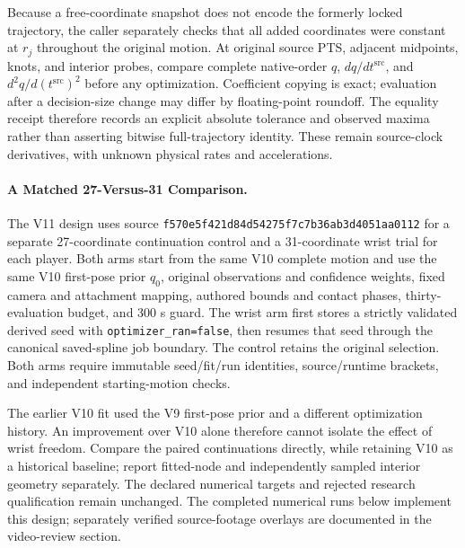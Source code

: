 \documentclass[11pt,letterpaper]{article}
\newcommand{\code}[1]{\nolinkurl{#1}}
\newcommand{\hash}[1]{{\footnotesize\nolinkurl{#1}}}
\begin{document}
Because a free-coordinate snapshot does not encode the formerly locked
trajectory, the caller separately checks that all added coordinates were
constant at $r_j$ throughout the original motion. At original source PTS,
adjacent midpoints, knots, and interior probes, compare complete native-order
$q$, $dq/dt^{\mathrm{src}}$, and $d^2q/d(t^{\mathrm{src}})^2$ before any
optimization. Coefficient copying is exact; evaluation after a decision-size
change may differ by floating-point roundoff. The equality receipt therefore
records an explicit absolute tolerance and observed maxima rather than
asserting bitwise full-trajectory identity. These remain source-clock
derivatives, with unknown physical rates and accelerations.

\paragraph{A Matched 27-Versus-31 Comparison.}
The V11 design uses source
\hash{f570e5f421d84d54275f7c7b36ab3d4051aa0112} for a separate
27-coordinate continuation control and a 31-coordinate wrist trial for each
player. Both arms start from the same V10 complete motion and use the same
V10 first-pose prior $q_0$, original observations and confidence weights,
fixed camera and attachment mapping, authored bounds and contact phases,
thirty-evaluation budget, and 300 s guard. The wrist arm first stores a
strictly validated derived seed with \code{optimizer_ran=false}, then resumes
that seed through the canonical saved-spline job boundary. The control retains
the original selection. Both arms require immutable seed/fit/run identities,
source/runtime brackets, and independent starting-motion checks.

The earlier V10 fit used the V9 first-pose prior and a different optimization
history. An improvement over V10 alone therefore cannot isolate the effect
of wrist freedom. Compare the paired continuations directly, while retaining
V10 as a historical baseline; report fitted-node and independently sampled
interior geometry separately. The declared numerical targets and rejected
research qualification remain unchanged. The completed numerical runs below
implement this design; separately verified source-footage overlays are
documented in the video-review section.
\end{document}
